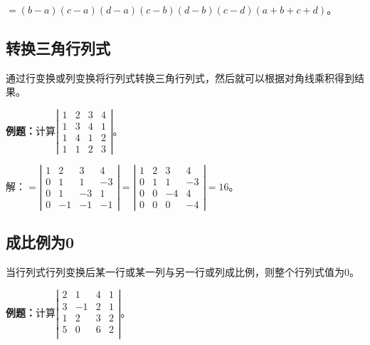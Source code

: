 \documentclass[UTF8, 12pt]{ctexart}
\begin{document}
$=(b-a)(c-a)(d-a)(c-b)(d-b)(c-d)(a+b+c+d)$。

\subsection{转换三角行列式}

通过行变换或列变换将行列式转换三角行列式，然后就可以根据对角线乘积得到结果。

\textbf{例题：}计算$\left|\begin{array}{cccc} 
    1 & 2 & 3 & 4 \\
    1 & 3 & 4 & 1 \\
    1 & 4 & 1 & 2 \\
    1 & 1 & 2 & 3
\end{array}\right|$。

解：$=\left|\begin{array}{cccc} 
    1 & 2 & 3 & 4 \\
    0 & 1 & 1 & -3 \\
    0 & 1 & -3 & 1 \\
    0 & -1 & -1 & -1
\end{array}\right|
=\left|\begin{array}{cccc} 
    1 & 2 & 3 & 4 \\
    0 & 1 & 1 & -3 \\
    0 & 0 & -4 & 4 \\
    0 & 0 & 0 & -4
\end{array}\right|=16$。

\subsection{成比例为0}

当行列式行列变换后某一行或某一列与另一行或列成比例，则整个行列式值为0。

\textbf{例题：}计算$\left|\begin{array}{cccc} 
    2 & 1 & 4 & 1 \\
    3 & -1  & 2 & 1 \\
    1 & 2 & 3 & 2 \\
    5 & 0 & 6 & 2 \\
\end{array}\right|$。
\end{document}
